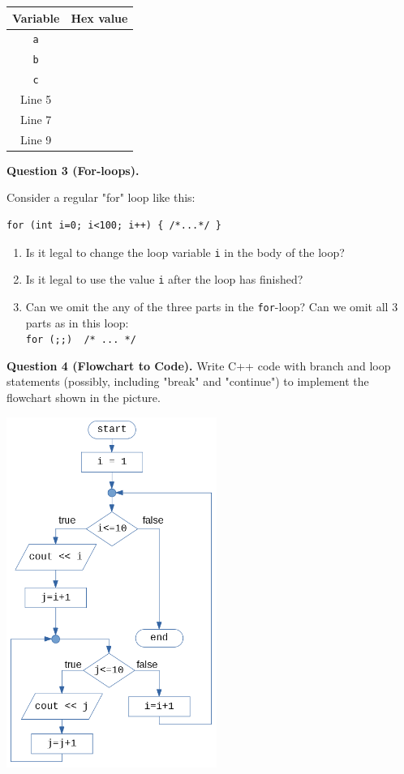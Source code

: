 \documentclass[11pt]{article}
\begin{document}
{\footnotesize
\begin{tabular}{|c|c|} \hline
{\bf Variable} & {\bf Hex value} \\ \hline
{\tt a} & \mbox{}\hspace{150pt}\mbox{} \\[10pt] \hline
{\tt b} & \\[10pt] \hline
{\tt c} & \\[10pt] \hline
Line 5 & \\[10pt] \hline
Line 7 & \\[10pt] \hline
Line 9 & \\[10pt] \hline
\end{tabular}
}




\vspace{20pt}
{\bf Question 3 (For-loops).}

Consider a regular "for" loop like this: 
\begin{verbatim}
for (int i=0; i<100; i++) { /*...*/ }
\end{verbatim}

\begin{enumerate}
\item Is it legal to change the loop variable {\tt i} 
in the body of the loop?
\item Is it legal to use the value {\tt i} after the loop 
has finished?
\item Can we omit the any of the three parts in the {\tt for}-loop?
Can we omit all $3$ parts as in this loop:\\ {\tt for (;;) { /* ... */ }}
\end{enumerate}



{\bf Question 4 (Flowchart to Code).} 
Write C++ code with branch and loop statements
(possibly, including "break" and "continue") to 
implement the flowchart shown in the picture.

\begin{center}
\includegraphics[width=2.7in]{assignment01-expr-control/assignment01-prob3-flowchart.png}
\end{center}
\end{document}

